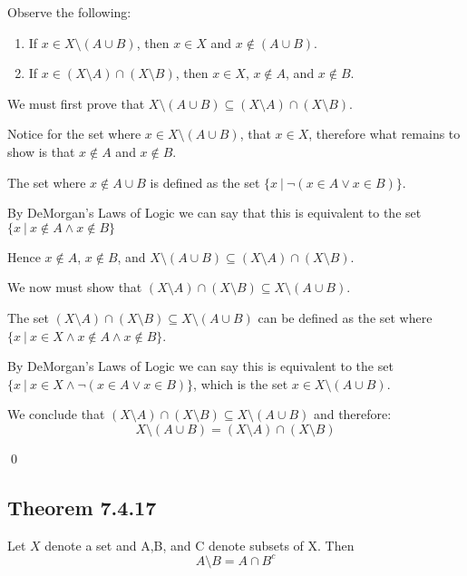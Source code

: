 \documentclass{article}
\begin{document}
Observe the following:
\begin{enumerate}
	\item If $x \in X \setminus (A \cup B)$, then $x \in X$ and $x \not\in (A \cup B)$.
	\item If $x \in (X \setminus A) \cap (X \setminus B)$, then $x \in X$, $x \not\in A$, and $x \not\in B$.
\end{enumerate}

We must first prove that $X \setminus (A \cup B) \subseteq (X \setminus A) \cap (X \setminus B)$.

Notice for the set where $x \in X \setminus (A \cup B)$, that $x \in X$, therefore what remains to show is that $x \not\in A$ and $x \not\in B$.

The set where $x \not\in A \cup B$ is defined as the set  $\{x\ |\ \lnot(x \in A \lor x \in B)\}$.

By DeMorgan's Laws of Logic we can say that this is equivalent to the set 
$\{x\ |\ x \not\in A \land x \not\in B\}$

Hence $x \not\in A$, $x \not\in B$, and $X \setminus (A \cup B) \subseteq (X \setminus A) \cap (X \setminus B)$.

We now must show that $(X \setminus A) \cap (X \setminus B) \subseteq X \setminus (A \cup B)$.

The set $(X \setminus A) \cap (X \setminus B) \subseteq X \setminus (A \cup B)$ can be defined as the set where $\{x\ |\ x \in X \land x \not\in A \land x \not\in B \}$.

By DeMorgan's Laws of Logic we can say this is equivalent to the set $\{x\ |\ x \in X \land \lnot(x \in A \lor x \in B) \}$, which is the set $x \in X \setminus (A \cup B)$.

We conclude that $(X \setminus A) \cap (X \setminus B) \subseteq X \setminus (A \cup B)$ and therefore:
\begin{equation}
	X \setminus (A \cup B) = (X \setminus A) \cap (X \setminus B)
\end{equation}

\qed



\pagebreak
\subsection{Theorem 7.4.17}
Let $X$ denote a set and A,B, and C denote subsets of X. Then
\begin{equation}
	A \setminus B = A \cap B^c
\end{equation}
\end{document}
